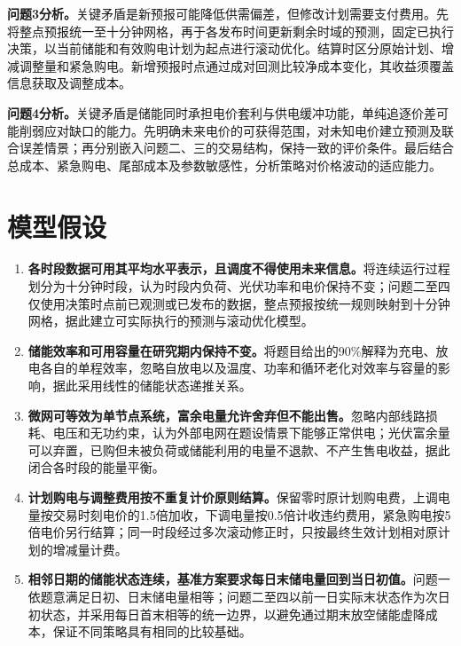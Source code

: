 \documentclass[UTF8,a4paper,12pt,fontset=fandol]{ctexart}
\numberwithin{equation}{section}
\begin{document}
\textbf{问题3分析。}关键矛盾是新预报可能降低供需偏差，但修改计划需要支付费用。先将整点预报统一至十分钟网格，再于各发布时间更新剩余时域的预测，固定已执行决策，以当前储能和有效购电计划为起点进行滚动优化。结算时区分原始计划、增减调整量和紧急购电。新增预报时点通过成对回测比较净成本变化，其收益须覆盖信息获取及调整成本。

\textbf{问题4分析。}关键矛盾是储能同时承担电价套利与供电缓冲功能，单纯追逐价差可能削弱应对缺口的能力。先明确未来电价的可获得范围，对未知电价建立预测及联合误差情景；再分别嵌入问题二、三的交易结构，保持一致的评价条件。最后结合总成本、紧急购电、尾部成本及参数敏感性，分析策略对价格波动的适应能力。

\par
\endgroup
\clearpage

\section{模型假设}
\label{sec:assumptions}

\begin{enumerate}
  \item \textbf{各时段数据可用其平均水平表示，且调度不得使用未来信息。}将连续运行过程划分为十分钟时段，认为时段内负荷、光伏功率和电价保持不变；问题二至四仅使用决策时点前已观测或已发布的数据，整点预报按统一规则映射到十分钟网格，据此建立可实际执行的预测与滚动优化模型。
  \item \textbf{储能效率和可用容量在研究期内保持不变。}将题目给出的90\%解释为充电、放电各自的单程效率，忽略自放电以及温度、功率和循环老化对效率与容量的影响，据此采用线性的储能状态递推关系。
  \item \textbf{微网可等效为单节点系统，富余电量允许舍弃但不能出售。}忽略内部线路损耗、电压和无功约束，认为外部电网在题设情景下能够正常供电；光伏富余量可以弃置，已购但未被负荷或储能利用的电量不退款、不产生售电收益，据此闭合各时段的能量平衡。
  \item \textbf{计划购电与调整费用按不重复计价原则结算。}保留零时原计划购电费，上调电量按交易时刻电价的1.5倍加收，下调电量按0.5倍计收违约费用，紧急购电按5倍电价另行结算；同一时段经过多次滚动修正时，只按最终生效计划相对原计划的增减量计费。
  \item \textbf{相邻日期的储能状态连续，基准方案要求每日末储电量回到当日初值。}问题一依题意满足日初、日末储电量相等；问题二至四以前一日实际末状态作为次日初状态，并采用每日首末相等的统一边界，以避免通过期末放空储能虚降成本，保证不同策略具有相同的比较基础。
\end{enumerate}
\end{document}
